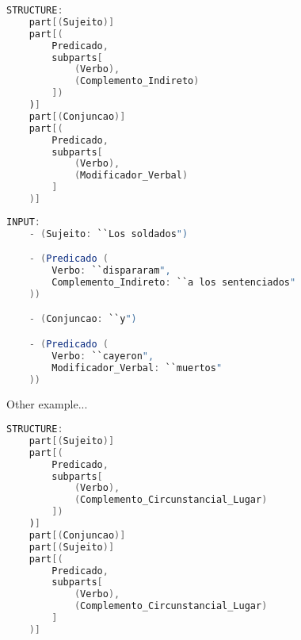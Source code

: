 \begin{center}
\begin{minipage}{12cm}
\begin{lstlisting}[language=java, basicstyle=\small, label={lst:example_complex_structure}, caption=Example of a complex sentence structure]
STRUCTURE:
    part[(Sujeito)]
    part[(
        Predicado,
        subparts[
            (Verbo),
            (Complemento_Indireto)
        ])
    )]
    part[(Conjuncao)]
	part[(
        Predicado,
        subparts[
            (Verbo),
            (Modificador_Verbal)
        ]
    )]
\end{lstlisting}
\end{minipage}
\end{center}


\begin{center}
\begin{minipage}{12cm}
\begin{lstlisting}[language=java, basicstyle=\small, label={lst:example_complex_input}, caption=Example of a complex sentence input]
INPUT:
    - (Sujeito: ``Los soldados")

    - (Predicado (
        Verbo: ``dispararam",
        Complemento_Indireto: ``a los sentenciados"
    ))

    - (Conjuncao: ``y")

    - (Predicado (
        Verbo: ``cayeron",
        Modificador_Verbal: ``muertos"
    ))
\end{lstlisting}
\end{minipage}
\end{center}

Other example...

\begin{center}
\begin{minipage}{13cm}
\begin{lstlisting}[language=java, basicstyle=\small, label={lst:example_complex_structure2}, caption=Example of a complex sentence structure]
STRUCTURE:
    part[(Sujeito)]
    part[(
        Predicado,
        subparts[
            (Verbo),
            (Complemento_Circunstancial_Lugar)
        ])
    )]
    part[(Conjuncao)]
    part[(Sujeito)]
	part[(
        Predicado,
        subparts[
            (Verbo),
            (Complemento_Circunstancial_Lugar)
        ]
    )]
\end{lstlisting}
\end{minipage}
\end{center}


